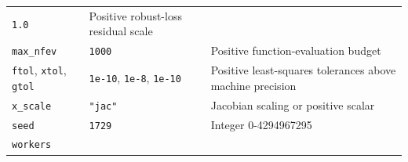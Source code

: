 \documentclass[
  10pt,
  a4paper,
  oneside]{scrreprt}
\begin{document}
\begin{longtable}[]{@{}lll@{}}
\begin{minipage}[t]{0.30\columnwidth}
\texttt{1.0}\strut
\end{minipage} & \begin{minipage}[t]{0.30\columnwidth}\raggedright
Positive robust-loss residual scale\strut
\end{minipage}\tabularnewline
\begin{minipage}[t]{0.30\columnwidth}\raggedright
\texttt{max\_nfev}\strut
\end{minipage} & \begin{minipage}[t]{0.30\columnwidth}\raggedright
\texttt{1000}\strut
\end{minipage} & \begin{minipage}[t]{0.30\columnwidth}\raggedright
Positive function-evaluation budget\strut
\end{minipage}\tabularnewline
\begin{minipage}[t]{0.30\columnwidth}\raggedright
\texttt{ftol}, \texttt{xtol}, \texttt{gtol}\strut
\end{minipage} & \begin{minipage}[t]{0.30\columnwidth}\raggedright
\texttt{1e-10}, \texttt{1e-8}, \texttt{1e-10}\strut
\end{minipage} & \begin{minipage}[t]{0.30\columnwidth}\raggedright
Positive least-squares tolerances above machine precision\strut
\end{minipage}\tabularnewline
\begin{minipage}[t]{0.30\columnwidth}\raggedright
\texttt{x\_scale}\strut
\end{minipage} & \begin{minipage}[t]{0.30\columnwidth}\raggedright
\texttt{"jac"}\strut
\end{minipage} & \begin{minipage}[t]{0.30\columnwidth}\raggedright
Jacobian scaling or positive scalar\strut
\end{minipage}\tabularnewline
\begin{minipage}[t]{0.30\columnwidth}\raggedright
\texttt{seed}\strut
\end{minipage} & \begin{minipage}[t]{0.30\columnwidth}\raggedright
\texttt{1729}\strut
\end{minipage} & \begin{minipage}[t]{0.30\columnwidth}\raggedright
Integer 0-4294967295\strut
\end{minipage}\tabularnewline
\begin{minipage}[t]{0.30\columnwidth}\raggedright
\texttt{workers}\strut

\end{minipage}
\end{longtable}
\end{document}
